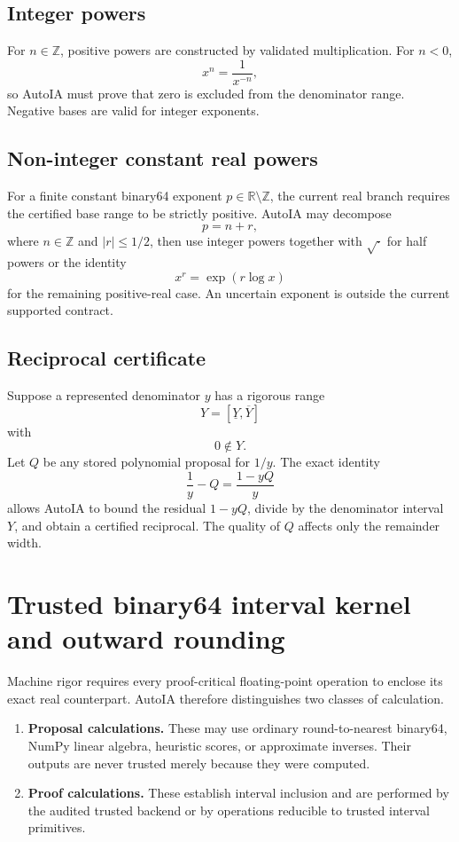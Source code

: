 \documentclass[11pt]{article}
\newcommand{\R}{\mathbb{R}}
\newcommand{\Z}{\mathbb{Z}}
\begin{document}
\subsection{Integer powers}

For \(n\in\Z\), positive powers are constructed by validated multiplication.
For \(n<0\),
\[
  x^n=\frac{1}{x^{-n}},
\]
so AutoIA must prove that zero is excluded from the denominator range.
Negative bases are valid for integer exponents.

\subsection{Non-integer constant real powers}

For a finite constant binary64 exponent \(p\in\R\setminus\Z\), the current real
branch requires the certified base range to be strictly positive.  AutoIA may
decompose
\[
  p=n+r,
\]
where \(n\in\Z\) and \(|r|\le1/2\), then use integer powers together with
\(\sqrt{\cdot}\) for half powers or the identity
\[
  x^r=\exp(r\log x)
\]
for the remaining positive-real case.  An uncertain exponent is outside the
current supported contract.

\subsection{Reciprocal certificate}

Suppose a represented denominator \(y\) has a rigorous range
\[
  Y=[\underline Y,\overline Y]
\]
with
\[
  0\notin Y.
\]
Let \(Q\) be any stored polynomial proposal for \(1/y\).  The exact identity
\[
  \frac{1}{y}-Q
  =\frac{1-yQ}{y}
\]
allows AutoIA to bound the residual \(1-yQ\), divide by the denominator interval
\(Y\), and obtain a certified reciprocal.  The quality of \(Q\) affects only the
remainder width.

\section{Trusted binary64 interval kernel and outward rounding}

Machine rigor requires every proof-critical floating-point operation to enclose
its exact real counterpart.  AutoIA therefore distinguishes two classes of
calculation.

\begin{enumerate}[leftmargin=*]
\item \textbf{Proposal calculations.}  These may use ordinary round-to-nearest
binary64, NumPy linear algebra, heuristic scores, or approximate inverses.
Their outputs are never trusted merely because they were computed.
\item \textbf{Proof calculations.}  These establish interval inclusion and are
performed by the audited trusted backend or by operations reducible to trusted
interval primitives.
\end{enumerate}
\end{document}
